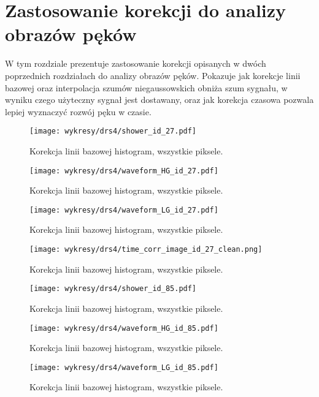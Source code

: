 \documentclass[a4paper,11pt,twoside]{article}
\begin{document}
\section{Zastosowanie korekcji do analizy obrazów pęków}
W tym rozdziale prezentuje zastosowanie korekcji opisanych w dwóch poprzednich rozdziałach do analizy obrazów pęków. Pokazuje jak korekcje linii bazowej oraz interpolacja szumów niegaussowskich obniża szum sygnału, w wyniku czego użyteczny sygnał jest dostawany, oraz jak korekcja czasowa pozwala lepiej wyznaczyć rozwój pęku w czasie.
\begin{figure}[H] 
\centering
\texttt{[image: wykresy/drs4/shower\_id\_27.pdf]}
\caption{Korekcja linii bazowej histogram, wszystkie piksele.}
\label{fig:muon_image}
\end{figure}

\begin{figure}[H] 
\centering
\texttt{[image: wykresy/drs4/waveform\_HG\_id\_27.pdf]}
\caption{Korekcja linii bazowej histogram, wszystkie piksele.}
\label{fig:muon_image}
\end{figure}

\begin{figure}[H] 
\centering
\texttt{[image: wykresy/drs4/waveform\_LG\_id\_27.pdf]}
\caption{Korekcja linii bazowej histogram, wszystkie piksele.}
\label{fig:muon_image}
\end{figure}

\begin{figure}[H] 
\centering
\texttt{[image: wykresy/drs4/time\_corr\_image\_id\_27\_clean.png]}
\caption{Korekcja linii bazowej histogram, wszystkie piksele.}
\label{fig:muon_image}
\end{figure}

\begin{figure}[H] 
\centering
\texttt{[image: wykresy/drs4/shower\_id\_85.pdf]}
\caption{Korekcja linii bazowej histogram, wszystkie piksele.}
\label{fig:muon_image}
\end{figure}

\begin{figure}[H] 
\centering
\texttt{[image: wykresy/drs4/waveform\_HG\_id\_85.pdf]}
\caption{Korekcja linii bazowej histogram, wszystkie piksele.}
\label{fig:muon_image}
\end{figure}

\begin{figure}[H] 
\centering
\texttt{[image: wykresy/drs4/waveform\_LG\_id\_85.pdf]}
\caption{Korekcja linii bazowej histogram, wszystkie piksele.}
\label{fig:muon_image}
\end{figure}
\end{document}
